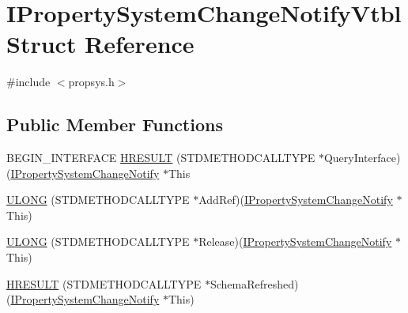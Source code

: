 \hypertarget{struct_i_property_system_change_notify_vtbl}{}\section{I\+Property\+System\+Change\+Notify\+Vtbl Struct Reference}
\label{struct_i_property_system_change_notify_vtbl}


{\ttfamily \#include $<$propsys.\+h$>$}

\subsection*{Public Member Functions}
\begin{DoxyCompactItemize}
\item 
B\+E\+G\+I\+N\+\_\+\+I\+N\+T\+E\+R\+F\+A\+CE \hyperlink{struct_i_property_system_change_notify_vtbl_a8d7228803ea507e2de332083650b63c9}{H\+R\+E\+S\+U\+LT} (S\+T\+D\+M\+E\+T\+H\+O\+D\+C\+A\+L\+L\+T\+Y\+PE $\ast$Query\+Interface)(\hyperlink{propsys_8h_aabbd4369ebbf19eeecf9deba76644dc0}{I\+Property\+System\+Change\+Notify} $\ast$This
\item 
\hyperlink{struct_i_property_system_change_notify_vtbl_ad50b99da0d6224f8930e4e65ad47777b}{U\+L\+O\+NG} (S\+T\+D\+M\+E\+T\+H\+O\+D\+C\+A\+L\+L\+T\+Y\+PE $\ast$Add\+Ref)(\hyperlink{propsys_8h_aabbd4369ebbf19eeecf9deba76644dc0}{I\+Property\+System\+Change\+Notify} $\ast$This)
\item 
\hyperlink{struct_i_property_system_change_notify_vtbl_ae9e1c96d5c8ece40718ac10b2d9cc3c2}{U\+L\+O\+NG} (S\+T\+D\+M\+E\+T\+H\+O\+D\+C\+A\+L\+L\+T\+Y\+PE $\ast$Release)(\hyperlink{propsys_8h_aabbd4369ebbf19eeecf9deba76644dc0}{I\+Property\+System\+Change\+Notify} $\ast$This)
\item 
\hyperlink{struct_i_property_system_change_notify_vtbl_a752c474c151f338799e1fb7d4bd01a92}{H\+R\+E\+S\+U\+LT} (S\+T\+D\+M\+E\+T\+H\+O\+D\+C\+A\+L\+L\+T\+Y\+PE $\ast$Schema\+Refreshed)(\hyperlink{propsys_8h_aabbd4369ebbf19eeecf9deba76644dc0}{I\+Property\+System\+Change\+Notify} $\ast$This)
\end{DoxyCompactItemize}
